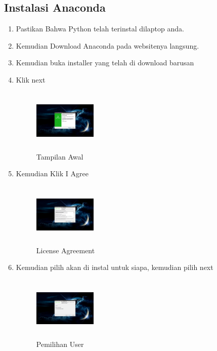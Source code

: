 \subsection{Instalasi Anaconda}
\begin{enumerate}
    \item Pastikan Bahwa Python telah terinstal dilaptop anda.
    \item Kemudian Download Anaconda pada websitenya langsung.
    \item Kemudian buka installer yang telah di download barusan
    \item Klik next
    \begin{figure}[!Htbp]
        \centering
        \includegraphics[width=3cm,height=3cm]{figures/Screenshot(80).png}
        \caption{Tampilan Awal}
        \label{awal}
        \end{figure}

    \item Kemudian Klik I Agree
    \begin{figure}[!Htbp]
        \centering
        \includegraphics[width=3cm,height=3cm]{figures/Screenshot(81).png}
        \caption{License Agreement}
        \label{License}
        \end{figure}

    \item Kemudian pilih akan di instal untuk siapa, kemudian pilih next
    \begin{figure}[!Htbp]
        \centering
        \includegraphics[width=3cm,height=3cm]{figures/Screenshot(82).png}
        \caption{Pemilihan User}
        \label{User}
        \end{figure}


\end{enumerate}
